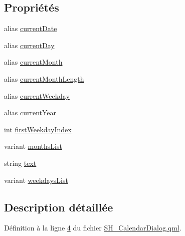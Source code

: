 \subsection*{Propriétés}
\begin{DoxyCompactItemize}
\item 
alias \hyperlink{classSH__CalendarDialog_a697b1e3c3faeee03197b575dd17cecdb}{current\-Date}
\item 
alias \hyperlink{classSH__CalendarDialog_a2c0ae47d55757e17551d5d6ea5413bb9}{current\-Day}
\item 
alias \hyperlink{classSH__CalendarDialog_a297eca7b6afa21350ff89a43580ff406}{current\-Month}
\item 
alias \hyperlink{classSH__CalendarDialog_a9708f1f6b6cdcf136c533e206a29d98e}{current\-Month\-Length}
\item 
alias \hyperlink{classSH__CalendarDialog_aa573e78a85228cbf2312b3bd7b776bbd}{current\-Weekday}
\item 
alias \hyperlink{classSH__CalendarDialog_a98760601bdd0a916ee33f4ed7ff185aa}{current\-Year}
\item 
int \hyperlink{classSH__CalendarDialog_ada6f44b6f1a93ae9ef40b2fd3acdabd1}{first\-Weekday\-Index}
\item 
variant \hyperlink{classSH__CalendarDialog_a86a4ef51cbfb7299a55bbddf2ae60f6a}{months\-List}
\item 
string \hyperlink{classSH__CalendarDialog_af074ec0c262421e8bdb58357e06985fa}{text}
\item 
variant \hyperlink{classSH__CalendarDialog_a4ceac0c8c8f2b0d05060ddd66986b8e0}{weekdays\-List}
\end{DoxyCompactItemize}


\subsection{Description détaillée}


Définition à la ligne \hyperlink{SH__CalendarDialog_8qml_source_l00004}{4} du fichier \hyperlink{SH__CalendarDialog_8qml_source}{S\-H\-\_\-\-Calendar\-Dialog.\-qml}.



